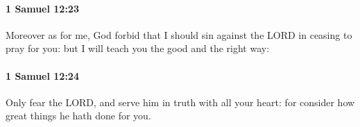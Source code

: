 		\paragraph{1 Samuel 12:23} %
			\label{1SAMUEL-12-23}

			Moreover as for me, God forbid that I should sin against the LORD in ceasing to pray for you: but I will teach you the good and the right way:


		\paragraph{1 Samuel 12:24} %
			\label{1SAMUEL-12-24}

			Only fear the LORD, and serve him in truth with all your heart: for consider how great things he hath done for you.



